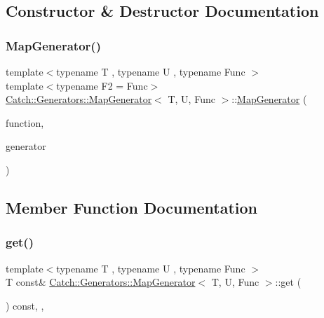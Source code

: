 \subsection{Constructor \& Destructor Documentation}
\mbox{\label{class_catch_1_1_generators_1_1_map_generator_a525c7eaf53ad220ee7add534aff2522c}} 
\subsubsection{\texorpdfstring{Map\+Generator()}{MapGenerator()}}
{\footnotesize\ttfamily template$<$typename T , typename U , typename Func $>$ \\
template$<$typename F2  = Func$>$ \\
\mbox{\hyperlink{class_catch_1_1_generators_1_1_map_generator}{Catch\+::\+Generators\+::\+Map\+Generator}}$<$ T, U, Func $>$\+::\mbox{\hyperlink{class_catch_1_1_generators_1_1_map_generator}{Map\+Generator}} (\begin{DoxyParamCaption}\item[{F2 \&\&}]{function,  }\item[{\mbox{\hyperlink{class_catch_1_1_generators_1_1_generator_wrapper}{Generator\+Wrapper}}$<$ U $>$ \&\&}]{generator }\end{DoxyParamCaption})\hspace{0.3cm}{\ttfamily [inline]}}



\subsection{Member Function Documentation}
\mbox{\label{class_catch_1_1_generators_1_1_map_generator_a199d377afba00519f202c59b4b488235}} 
\subsubsection{\texorpdfstring{get()}{get()}}
{\footnotesize\ttfamily template$<$typename T , typename U , typename Func $>$ \\
T const\& \mbox{\hyperlink{class_catch_1_1_generators_1_1_map_generator}{Catch\+::\+Generators\+::\+Map\+Generator}}$<$ T, U, Func $>$\+::get (\begin{DoxyParamCaption}{ }\end{DoxyParamCaption}) const\hspace{0.3cm}{\ttfamily [inline]}, {\ttfamily [override]}, {\ttfamily [virtual]}}



